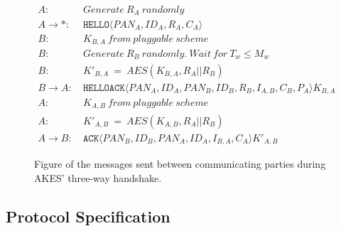 \begin{figure}[h]
\begin{tcolorbox}[title=Three-way handshake in AKES]
\begin{align*}
A:\ & Generate\ R_A\ randomly\\
A \rightarrow *:\ & \texttt{HELLO}\langle{PAN_A, ID_A, R_A, C_A}\rangle{}\\
B:\ & K_{B,A}\ from\ pluggable\ scheme\\
B:\ & Generate\ R_B\ randomly.\ Wait\ for\ T_w \leq M_w\\
B:\ & K'_{B,A}\ =\ AES(K_{B,A}, R_A || R_B)\\
B \rightarrow A:\ & \texttt{HELLOACK}\langle{PAN_A, ID_A, PAN_B, ID_B, R_B, I_{A,B}, C_B, P_A}\rangle{K_{B,A}}\\
A:\ & K_{A,B}\ from\ pluggable\ scheme\\
A:\ & K'_{A,B}\ =\ AES(K_{A,B}, R_A || R_B)\\
A \rightarrow B:\ & \texttt{ACK}\langle{PAN_B, ID_B, PAN_A, ID_A, I_{B,A}, C_A}\rangle{K'_{A,B}}
\end{align*}
\end{tcolorbox}
\caption{Figure of the messages sent between communicating parties during AKES' three-way handshake.}
\label{fig:akes-handshake}
\end{figure}

\subsection{Protocol Specification}

